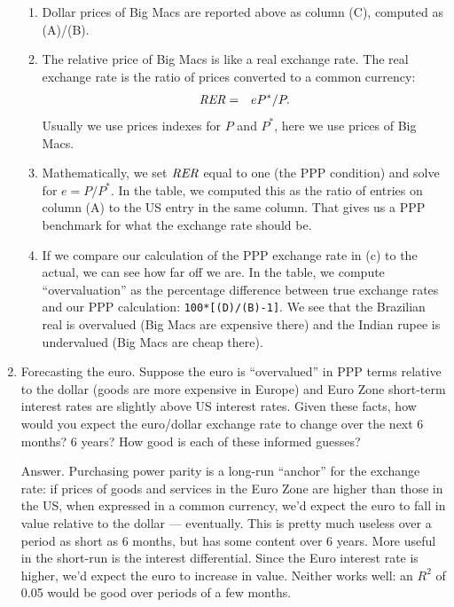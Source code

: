 \begin{enumerate}
\begin{enumerate}
\item Dollar prices of Big Macs are reported above as column (C),
computed as (A)/(B).

\item The relative price of Big Macs is like a real exchange rate.
The real exchange rate is the ratio of prices converted to a common currency:
\begin{eqnarray*}
    \mbox{\it RER\/}  &=&  eP^*/P .
\end{eqnarray*}
Usually we use prices indexes for $P$ and $P^*$, here we use prices of Big Macs.

\item Mathematically, we set $\mbox{\em RER\/}$ equal to one (the PPP condition)
and solve for $e = P/P^*$.
In the table, we computed this as the ratio of entries on column (A) to the US
entry in the same column.
That gives us a PPP benchmark for what the exchange rate should be.

\item If we compare our calculation of the PPP exchange rate in (c) to the actual,
we can see how far off we are.
In the table, we compute ``overvaluation'' as the percentage difference between
true exchange rates and our PPP calculation:  {\tt 100*[(D)/(B)-1]}.
We see that the Brazilian real is overvalued (Big Macs are expensive there)
and the Indian rupee is undervalued (Big Macs are cheap there).
\end{enumerate}

\item Forecasting the euro.
Suppose the euro is ``overvalued'' in PPP terms relative to the
dollar (goods are more expensive in Europe) and Euro Zone short-term interest rates
are slightly above US interest rates.
Given these facts, how would you expect the euro/dollar exchange rate to change over the next 6 months?  6 years?
How good is each of these informed guesses?

Answer.  Purchasing power parity is a long-run ``anchor'' for the
exchange rate:  if prices of goods and services in the Euro Zone
are higher than those in the US, when expressed in a common currency,
we'd expect the euro to fall in value relative to the dollar
--- eventually.
This is pretty much useless over a period as short as 6 months,
but has some content over 6 years.
More useful in the short-run is the interest differential.
Since the Euro interest rate is higher, we'd expect the euro to increase in value.
Neither works well:  an $R^2$ of 0.05 would be good over
periods of a few months.
\end{enumerate}
\setlength{\leftmargini}{\oldleftmargini}


